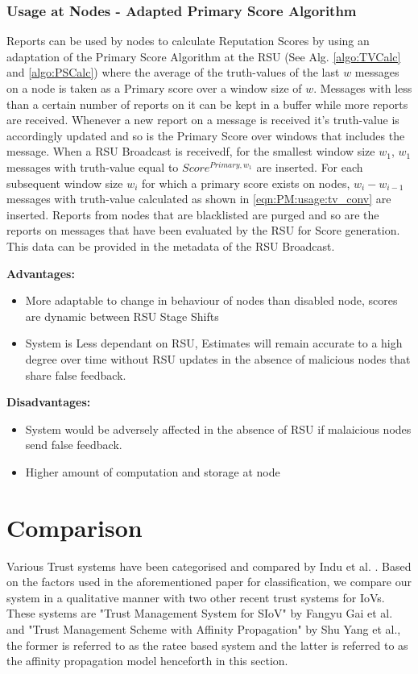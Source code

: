\documentclass[journal]{IEEEtran}
\begin{document}
\subsubsection{Usage at Nodes - Adapted Primary Score Algorithm}
\label{sec:PM:usage:adapted@node}
Reports can be used by nodes to calculate Reputation Scores by using an adaptation of the Primary Score Algorithm at the RSU (See Alg. \ref{algo:TVCalc} and \ref{algo:PSCalc}) where the average of the truth-values of the last $ w $ messages on a node is taken as a Primary score over a window size of $ w $. Messages with less than a certain number of reports on it can be kept in a buffer while more reports are received. Whenever a new report on a message is received it's truth-value is accordingly updated and so is the Primary Score over windows that includes the message. When a RSU Broadcast is receivedf, for the smallest window size $ w_1 $, $ w_1 $ messages with truth-value equal to $ Score^{Primary,w_1} $ are inserted. For each subsequent window size $ w_i $ for which a primary score exists on nodes, $ w_i - w_{i-1} $ messages with truth-value calculated as shown in \ref{eqn:PM:usage:tv_conv} are inserted. Reports from nodes that are blacklisted are purged and so are the reports on messages that have been evaluated by the RSU for Score generation. This data can be provided in the metadata of the RSU Broadcast.

\textbf{Advantages:}
\begin{itemize}
	\item More adaptable to change in behaviour of nodes than disabled node, scores are dynamic between RSU Stage Shifts
	\item System is Less dependant on RSU, Estimates will remain accurate to a high degree over time without RSU updates in the absence of malicious nodes that share false feedback.
\end{itemize}
\textbf{Disadvantages:} 
\begin{itemize}
	\item System would be adversely affected in the absence of RSU if malaicious nodes send false feedback.
	\item Higher amount of computation and storage at node
\end{itemize}
\section{Comparison}
\label{sec:comparison}
Various Trust systems have been categorised and compared by Indu et al. \cite{c:compareTrust}. Based on the factors used in the aforementioned paper for classification, we compare our system in a qualitative manner with two other recent trust systems for IoVs. These systems are "Trust Management System for SIoV" by Fangyu Gai et al.\cite{c:trustSys_Ratee_Centralised_EntityBased} and  "Trust Management Scheme with Affinity Propagation" by Shu Yang et al.\cite{c:trustSys_affinity_Distributed_DataBased}, the former is referred to as the ratee based system and the latter is referred to as the affinity propagation model henceforth in this section.
\end{document}
